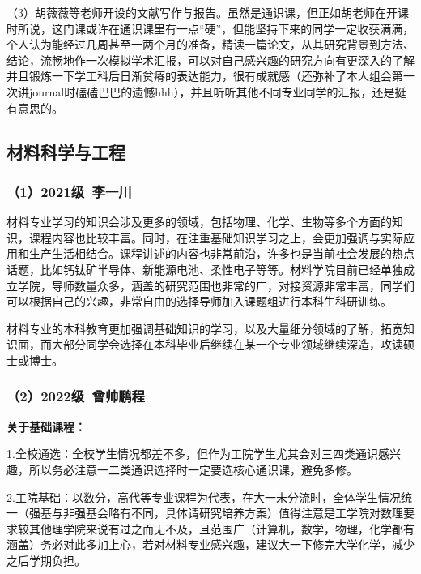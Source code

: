 \vspace{10pt}

（3）胡薇薇等老师开设的文献写作与报告。虽然是通识课，但正如胡老师在开课时所说，这门课或许在通识课里有一点“硬”，但能坚持下来的同学一定收获满满，个人认为能经过几周甚至一两个月的准备，精读一篇论文，从其研究背景到方法、结论，流畅地作一次模拟学术汇报，可以对自己感兴趣的研究方向有更深入的了解并且锻炼一下学工科后日渐贫瘠的表达能力，很有成就感（还弥补了本人组会第一次讲journal时磕磕巴巴的遗憾hhh），并且听听其他不同专业同学的汇报，还是挺有意思的。  

\subsection{材料科学与工程}
\subsubsection{（1）2021级\ 李一川}
材料专业学习的知识会涉及更多的领域，包括物理、化学、生物等多个方面的知识，课程内容也比较丰富。同时，在注重基础知识学习之上，会更加强调与实际应用和生产生活相结合。课程讲述的内容也非常前沿，许多也是当前社会发展的热点话题，比如钙钛矿半导体、新能源电池、柔性电子等等。材料学院目前已经单独成立学院，导师数量众多，涵盖的研究范围也非常的广，对接资源非常丰富，同学们可以根据自己的兴趣，非常自由的选择导师加入课题组进行本科生科研训练。

\vspace{10pt}

材料专业的本科教育更加强调基础知识的学习，以及大量细分领域的了解，拓宽知识面，而大部分同学会选择在本科毕业后继续在某一个专业领域继续深造，攻读硕士或博士。

\subsubsection{（2）2022级\ 曾帅鹏程}
\textbf{关于基础课程：}

1.全校通选：全校学生情况都差不多，但作为工院学生尤其会对三四类通识感兴趣，所以务必注意一二类通识选择时一定要选核心通识课，避免多修。

\vspace{10pt}

2.工院基础：以数分，高代等专业课程为代表，在大一未分流时，全体学生情况统一（强基与非强基会略有不同，具体请研究培养方案）值得注意是工学院对数理要求较其他理学院来说有过之而无不及，且范围广（计算机，数学，物理，化学都有涵盖）务必对此多加上心，若对材料专业感兴趣，建议大一下修完大学化学，减少之后学期负担。

\vspace{10pt}

